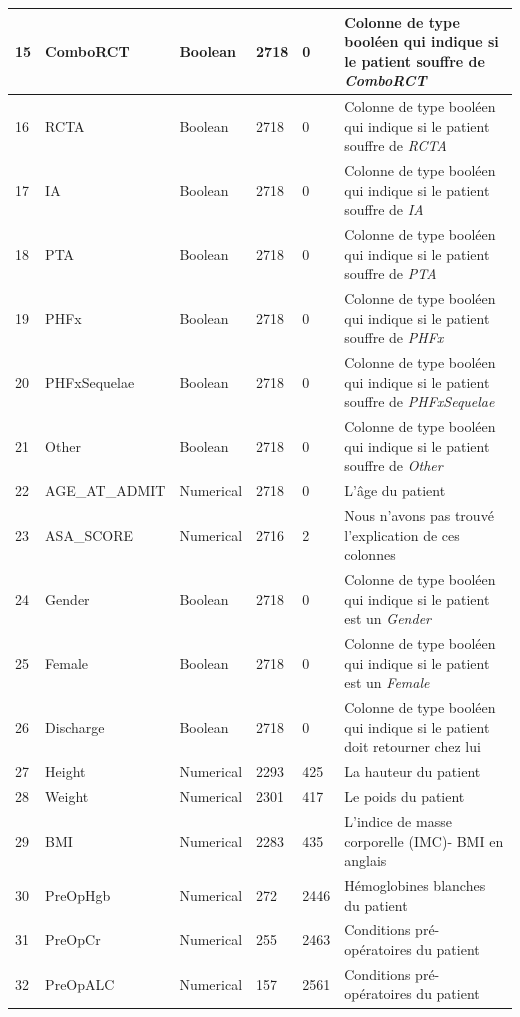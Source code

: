 \documentclass[12pt, french]{report}
\begin{document}
\begin{longtable}{| p{} | p{} | p{} | p{}  | p{} | p{} |  }
15 &	ComboRCT & Boolean & 2718 & 0& Colonne de type booléen qui indique si le patient souffre  de \textit{ComboRCT} \\ \hline 
16 &	RCTA & Boolean & 2718 & 0& Colonne de type booléen qui indique si le patient souffre  de \textit{RCTA} \\ \hline 
17 &	IA & Boolean & 2718 & 0& Colonne de type booléen qui indique si le patient souffre  de \textit{IA} \\ \hline 
18 &	PTA & Boolean & 2718 & 0& Colonne de type booléen qui indique si le patient souffre  de \textit{PTA} \\ \hline 
19 &	PHFx & Boolean & 2718 & 0& Colonne de type booléen qui indique si le patient souffre  de \textit{PHFx} \\ \hline 
20 &	PHFxSequelae & Boolean & 2718 & 0& Colonne de type booléen qui indique si le patient souffre  de \textit{PHFxSequelae} \\ \hline 
21 &	Other & Boolean & 2718 & 0& Colonne de type booléen qui indique si le patient souffre  de \textit{Other} \\ \hline 
22 &	AGE\_AT\_ADMIT & Numerical & 2718 & 0 & L'âge du patient \\ \hline 
23 &	ASA\_SCORE & Numerical & 2716 & 2 & Nous n’avons pas trouvé l’explication de ces colonnes \\ \hline 
24 &	Gender & Boolean & 2718 & 0& Colonne de type booléen qui indique si le patient  est un \textit{Gender} \\ \hline 
25 &	Female & Boolean & 2718 & 0& Colonne de type booléen qui indique si le patient  est un \textit{Female} \\ \hline 
26 &	Discharge & Boolean & 2718 & 0& Colonne de type booléen qui indique si le patient  doit retourner chez lui \\ \hline 
27 &	Height & Numerical & 2293 & 425 & La hauteur du patient \\ \hline 
28 &	Weight & Numerical & 2301 & 417 & Le poids du patient \\ \hline 
29 &	BMI & Numerical & 2283 & 435 & L'indice de masse corporelle (IMC)- BMI en anglais \\ \hline 
30 &	PreOpHgb & Numerical & 272 & 2446 & Hémoglobines blanches du patient \\ \hline 
31 &	PreOpCr & Numerical & 255 & 2463 & Conditions pré-opératoires du patient \\ \hline 
32 &	PreOpALC & Numerical & 157 & 2561 &  Conditions pré-opératoires du patient \\ \hline 

\end{longtable}
\end{document}
